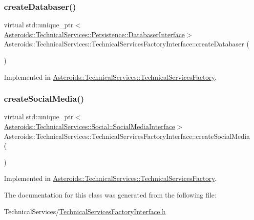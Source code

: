 \subsubsection{\texorpdfstring{create\+Databaser()}{createDatabaser()}}
{\footnotesize\ttfamily virtual std\+::unique\+\_\+ptr$<$\hyperlink{classAsteroids_1_1TechnicalServices_1_1Persistence_1_1DatabaserInterface}{Asteroids\+::\+Technical\+Services\+::\+Persistence\+::\+Databaser\+Interface}$>$ Asteroids\+::\+Technical\+Services\+::\+Technical\+Services\+Factory\+Interface\+::create\+Databaser (\begin{DoxyParamCaption}{ }\end{DoxyParamCaption})\hspace{0.3cm}{\ttfamily [pure virtual]}}



Implemented in \hyperlink{classAsteroids_1_1TechnicalServices_1_1TechnicalServicesFactory_a86d467c90df00dd759aae317a7d75e57}{Asteroids\+::\+Technical\+Services\+::\+Technical\+Services\+Factory}.

\mbox{\label{classAsteroids_1_1TechnicalServices_1_1TechnicalServicesFactoryInterface_a28196b5f4d7855fbc0d426a4004e857c}} 
\subsubsection{\texorpdfstring{create\+Social\+Media()}{createSocialMedia()}}
{\footnotesize\ttfamily virtual std\+::unique\+\_\+ptr$<$\hyperlink{classAsteroids_1_1TechnicalServices_1_1Social_1_1SocialMediaInterface}{Asteroids\+::\+Technical\+Services\+::\+Social\+::\+Social\+Media\+Interface}$>$ Asteroids\+::\+Technical\+Services\+::\+Technical\+Services\+Factory\+Interface\+::create\+Social\+Media (\begin{DoxyParamCaption}{ }\end{DoxyParamCaption})\hspace{0.3cm}{\ttfamily [pure virtual]}}



Implemented in \hyperlink{classAsteroids_1_1TechnicalServices_1_1TechnicalServicesFactory_a26508a6297b0bbcb92370e597bb5fd15}{Asteroids\+::\+Technical\+Services\+::\+Technical\+Services\+Factory}.



The documentation for this class was generated from the following file\+:\begin{DoxyCompactItemize}
\item 
Technical\+Services/\hyperlink{TechnicalServicesFactoryInterface_8h}{Technical\+Services\+Factory\+Interface.\+h}\end{DoxyCompactItemize}
